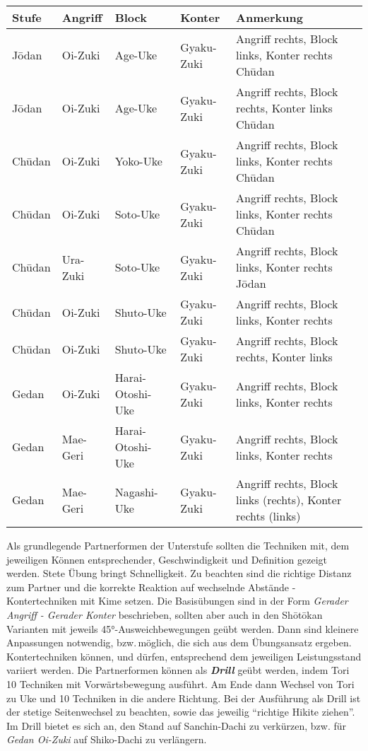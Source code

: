 	\null\vfill\null
	{\small 	\begin{tabularx}{\textwidth}{llllX}
			\textbf{Stufe} 	& \textbf{Angriff} 	& \textbf{Block}&\textbf{Konter}&Anmerkung\\
			\midrule
			J\={o}dan 	& Oi-Zuki 	& Age-Uke			&Gyaku-Zuki	& Angriff rechts, Block links, Konter rechts Ch\={u}dan \\
			J\={o}dan 	& Oi-Zuki 	& Age-Uke			&Gyaku-Zuki	& Angriff rechts, Block rechts, Konter links Ch\={u}dan \\	
			Ch\={u}dan	& Oi-Zuki	& Yoko-Uke			&Gyaku-Zuki	& Angriff rechts, Block links, Konter rechts Ch\={u}dan \\
			Ch\={u}dan	& Oi-Zuki	& Soto-Uke			&Gyaku-Zuki	& Angriff rechts, Block links, Konter rechts Ch\={u}dan \\
			Ch\={u}dan	& Ura-Zuki	& Soto-Uke			&Gyaku-Zuki	& Angriff rechts, Block links, Konter rechts J\={o}dan \\
			Ch\={u}dan	& Oi-Zuki	& Shuto-Uke			&Gyaku-Zuki	& Angriff rechts, Block links, Konter rechts \\
			Ch\={u}dan	& Oi-Zuki	& Shuto-Uke			&Gyaku-Zuki	& Angriff rechts, Block rechts, Konter links \\
			Gedan		& Oi-Zuki	& Harai-Otoshi-Uke	&Gyaku-Zuki	& Angriff rechts, Block links, Konter rechts  \\
			Gedan		& Mae-Geri	& Harai-Otoshi-Uke	&Gyaku-Zuki	& Angriff rechts, Block links, Konter rechts \\
			Gedan		& Mae-Geri	& Nagashi-Uke		&Gyaku-Zuki	& Angriff rechts, Block links (rechts), Konter rechts (links)\\
			\midrule
	\end{tabularx}}\null\vfill\null
	\begin{center}
		\begin{minipage}[t]{\textwidth-2\tabcolsep}
			{\footnotesize Als grundlegende Partnerformen der Unterstufe sollten die Techniken mit, dem jeweiligen Können entsprechender, Geschwindigkeit und Definition gezeigt werden. Stete Übung bringt Schnelligkeit. Zu beachten sind die richtige Distanz zum Partner und die korrekte Reaktion auf wechselnde Abstände - Kontertechniken mit Kime setzen. Die Basisübungen sind in der Form \textit{Gerader Angriff - Gerader Konter} beschrieben, sollten aber auch in den Sh\={o}t\={o}kan Varianten mit jeweils 45°-Ausweichbewegungen geübt werden. Dann sind kleinere Anpassungen notwendig, bzw.\,möglich, die sich aus dem Übungsansatz ergeben. Kontertechniken können, und dürfen, entsprechend dem jeweiligen Leistungsstand variiert werden.}\onehalfspacing\singlespacing
			{\footnotesize Die Partnerformen können als \textbf{\textit{Drill}} geübt werden, indem Tori 10 Techniken mit Vorwärtsbewegung ausführt. Am Ende dann Wechsel von Tori zu Uke und 10 Techniken in die andere Richtung. Bei der Ausführung als Drill ist der stetige Seitenwechsel zu beachten, sowie das jeweilig \textquotedblleft richtige Hikite ziehen\textquotedblright. Im Drill bietet es sich an, den Stand auf Sanchin-Dachi zu verkürzen, bzw. für \textit{Gedan Oi-Zuki} auf Shiko-Dachi zu verlängern.}
		\end{minipage}
	\end{center}\null\vfill\null